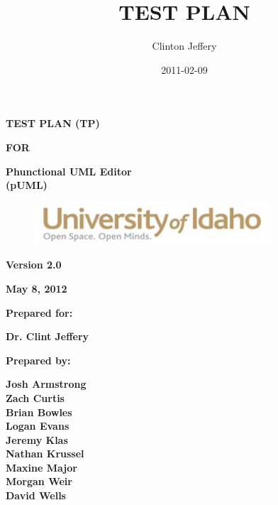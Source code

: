 \documentclass[twoside,letterpaper]{article}
\title{TEST PLAN}
\author{Clinton Jeffery}
\date{2011-02-09}
\begin{document}
\clearpage\setcounter{page}{1}\pagestyle{Standard}
\thispagestyle{FirstPage}

{\centering\bfseries
TEST PLAN (TP)
\par}

{\centering\bfseries
FOR
\par}


\bigskip

{\centering\bfseries
Phunctional UML Editor
\\(pUML)
\par}


\bigskip


\bigskip


\bigskip

{\centering \par}

\begin{figure}
\centering
\includegraphics[width=3.5in]{uidahologo.jpg}
\end{figure}

\bigskip


\bigskip


\bigskip


\bigskip


{\centering\bfseries
Version 2.0
\par}

{\centering\bfseries
May 8, 2012
\par}


\bigskip


\bigskip

{\centering\bfseries
Prepared for:
\par}

{\centering\bfseries
Dr. Clint Jeffery
\par}


\bigskip



{\centering\bfseries
Prepared by:
\par}

{\centering\bfseries
Josh Armstrong
\\Zach Curtis
\\Brian Bowles
\\Logan Evans
\\Jeremy Klas
\\Nathan Krussel
\\Maxine Major
\\Morgan Weir
\\David Wells
\par}
\end{document}
